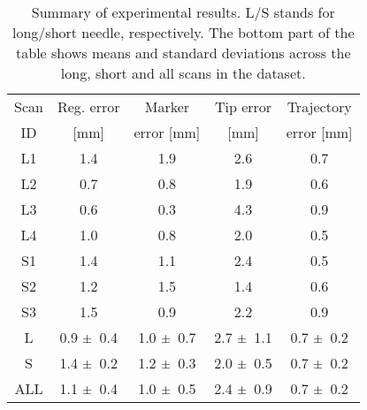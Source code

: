 \begin{table}[t]
\begin{center}
\begin{tabular}{|c||c|c|c|c|}
\hline
Scan & Reg. error & Marker & Tip error & Trajectory\\
ID  & [mm] & error [mm] & [mm] & error  [mm]\\
\hline
\hline
L1 & 1.4 & 1.9 & 2.6 & 0.7\\
\hline
L2 & 0.7 & 0.8 & 1.9 & 0.6\\
\hline
L3 & 0.6 & 0.3 & 4.3 & 0.9 \\
\hline
L4 & 1.0 & 0.8 & 2.0 & 0.5\\
\hline
S1 & 1.4 & 1.1 & 2.4 & 0.5\\
\hline
S2 & 1.2 & 1.5 & 1.4 & 0.6\\
\hline
S3 & 1.5 & 0.9 & 2.2 & 0.9\\
\hline
\hline
L & 
0.9 $\pm\hspace{0.04cm}$ 0.4 & 
1.0 $\pm\hspace{0.04cm}$ 0.7 & 
2.7 $\pm\hspace{0.04cm}$ 1.1 & 
0.7 $\pm\hspace{0.04cm}$ 0.2\\
\hline
S & 
1.4 $\pm\hspace{0.04cm}$ 0.2 &  
1.2 $\pm\hspace{0.04cm}$ 0.3 & 
2.0 $\pm\hspace{0.04cm}$ 0.5 &  
0.7 $\pm\hspace{0.04cm}$ 0.2\\
\hline
ALL & 
1.1 $\pm\hspace{0.04cm}$ 0.4 &  
1.0 $\pm\hspace{0.04cm}$ 0.5 &  
2.4 $\pm\hspace{0.04cm}$ 0.9 &  
0.7 $\pm\hspace{0.04cm}$ 0.2\\
\hline
\end{tabular}
\caption{Summary of experimental results. L/S stands for long/short needle, respectively.
The bottom part of the table shows means and standard deviations across the long, short and all scans in the dataset.}
\label{results_table}
\end{center}
\end{table}
